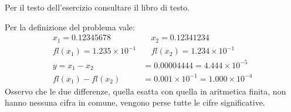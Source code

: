 \begin{exercise}[1.17]
Per il testo dell'esercizio consultare il libro di testo.
\end{exercise}
Per la definizione del problema vale:
\begin{displaymath}
\begin{split}
	x_{1} = 0.12345678 & \quad x_{2} = 0.12341234 \\
	fl(x_{1}) = 1.235 \times 10^{-1} & \quad fl(x_{2}) = 1.234 \times 10^{-1} \\
	y = x_{1} - x_{2} &= 0.00004444 = 4.444 \times 10^{-5} \\
	fl(x_{1}) - fl(x_{2}) &= 0.001 \times 10^{-1} = 1.000 \times 10^{-4}
\end{split}
\end{displaymath}
Osservo che le due differenze, quella esatta con quella in aritmetica finita,
non hanno nessuna cifra in comune, vengono perse tutte le cifre significative.

